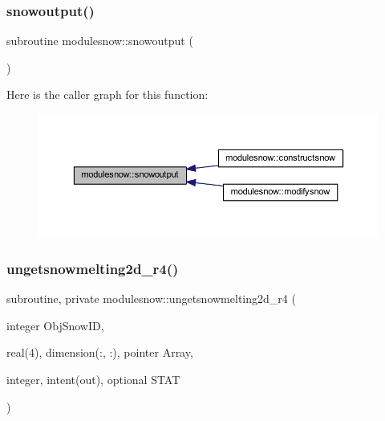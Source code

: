 \subsubsection{\texorpdfstring{snowoutput()}{snowoutput()}}
{\footnotesize\ttfamily subroutine modulesnow\+::snowoutput (\begin{DoxyParamCaption}{ }\end{DoxyParamCaption})\hspace{0.3cm}{\ttfamily [private]}}

Here is the caller graph for this function\+:\nopagebreak
\begin{figure}[H]
\begin{center}
\leavevmode
\includegraphics[width=350pt]{namespacemodulesnow_ab811c0f4d09e6ff82a7c0bc8b88a1503_icgraph}
\end{center}
\end{figure}
\mbox{\label{namespacemodulesnow_ad46c82bdf9dd0bdd57a7edce05221094}} 
\subsubsection{\texorpdfstring{ungetsnowmelting2d\+\_\+r4()}{ungetsnowmelting2d\_r4()}}
{\footnotesize\ttfamily subroutine, private modulesnow\+::ungetsnowmelting2d\+\_\+r4 (\begin{DoxyParamCaption}\item[{integer}]{Obj\+Snow\+ID,  }\item[{real(4), dimension(\+:, \+:), pointer}]{Array,  }\item[{integer, intent(out), optional}]{S\+T\+AT }\end{DoxyParamCaption})\hspace{0.3cm}{\ttfamily [private]}}

